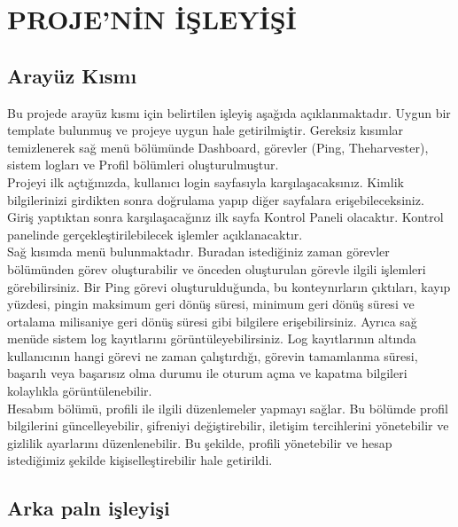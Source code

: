 \section{PROJE'NİN İŞLEYİŞİ}
\subsection{Arayüz Kısmı }
Bu projede arayüz kısmı için belirtilen işleyiş aşağıda açıklanmaktadır. Uygun bir template bulunmuş ve projeye uygun hale getirilmiştir. Gereksiz kısımlar temizlenerek sağ menü bölümünde Dashboard, görevler (Ping, Theharvester), sistem logları ve Profil bölümleri oluşturulmuştur.\\
Projeyi ilk açtığınızda, kullanıcı login sayfasıyla karşılaşacaksınız. Kimlik bilgilerinizi girdikten sonra doğrulama yapıp diğer sayfalara erişebileceksiniz. Giriş yaptıktan sonra karşılaşacağınız ilk sayfa Kontrol Paneli olacaktır. Kontrol panelinde gerçekleştirilebilecek işlemler açıklanacaktır.\\
Sağ kısımda menü bulunmaktadır. Buradan istediğiniz zaman görevler bölümünden görev oluşturabilir ve önceden oluşturulan görevle ilgili işlemleri görebilirsiniz. Bir Ping görevi oluşturulduğunda, bu konteynırların çıktıları, kayıp yüzdesi, pingin maksimum geri dönüş süresi, minimum geri dönüş süresi ve ortalama milisaniye geri dönüş süresi gibi bilgilere erişebilirsiniz. Ayrıca sağ menüde sistem log kayıtlarını görüntüleyebilirsiniz. Log kayıtlarının altında kullanıcının hangi görevi ne zaman çalıştırdığı, görevin tamamlanma süresi, başarılı veya başarısız olma durumu ile oturum açma ve kapatma bilgileri kolaylıkla görüntülenebilir.\\
Hesabım bölümü, profili ile ilgili düzenlemeler yapmayı sağlar. Bu bölümde profil bilgilerini güncelleyebilir, şifreniyi değiştirebilir, iletişim tercihlerini yönetebilir ve gizlilik ayarlarını düzenlenebilir. Bu şekilde, profili yönetebilir ve hesap istediğimiz  şekilde kişiselleştirebilir hale getirildi.
\subsection{Arka paln işleyişi}


